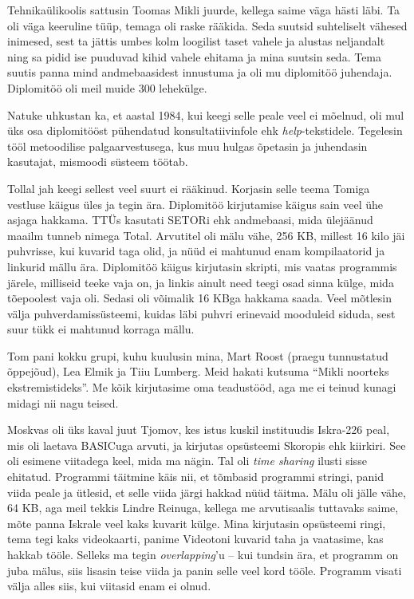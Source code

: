  
Tehnikaülikoolis sattusin 
Toomas Mikli juurde, kellega saime väga hästi 
läbi. Ta oli väga keeruline tüüp, temaga oli raske rääkida. 
Seda suutsid suhteliselt vähesed inimesed, sest ta jättis umbes kolm loogilist 
taset vahele ja alustas neljandalt ning sa pidid ise puuduvad kihid vahele 
ehitama ja mina suutsin seda. 
Tema suutis panna mind andmebaasidest innustuma ja oli 
mu diplomitöö juhendaja. Diplomitöö oli meil muide 300 lehekülge. 

Natuke uhkustan ka, et aastal 1984, kui keegi selle peale veel ei mõelnud, oli mul üks osa
diplomitööst pühendatud konsultatiivinfole ehk \emph{help}-tekstidele. 
Tegelesin tööl metoodilise palgaarvestusega, kus muu 
hulgas õpetasin ja juhendasin kasutajat, mismoodi süsteem töötab. 


Tollal jah keegi sellest veel suurt ei rääkinud. Korjasin selle teema
Tomiga vestluse käigus üles ja tegin ära. 
Diplomitöö kirjutamise käigus sain veel ühe asjaga hakkama. TTÜs kasutati 
SETORi ehk andmebaasi, mida ülejäänud 
maailm tunneb nimega Total. Arvutitel 
oli mälu vähe, 256 KB, millest 16 kilo jäi puhvrisse, kui kuvarid taga 
olid, ja nüüd ei mahtunud enam kompilaatorid ja linkurid mällu ära. Diplomitöö 
käigus kirjutasin skripti, mis vaatas programmis järele, milliseid teeke 
vaja on, ja linkis ainult need teegi osad sinna külge, mida tõepoolest vaja 
oli. Sedasi oli võimalik 16 KBga hakkama saada. Veel mõtlesin välja puhverdamissüsteemi, kuidas läbi puhvri erinevaid mooduleid siduda, sest 
suur tükk ei mahtunud korraga mällu. 

Tom pani kokku grupi, kuhu kuulusin mina, Mart Roost 
(praegu tunnustatud õppejõud), Lea 
Elmik ja Tiiu Lumberg. Meid hakati kutsuma \enquote{Mikli noorteks 
ekstremistideks}. Me kõik kirjutasime oma teadustööd, aga me ei teinud 
kunagi midagi nii nagu teised. 

Moskvas oli üks kaval juut Tjomov, kes istus kuskil instituudis 
Iskra-226 peal, mis oli laetava BASICuga arvuti, ja
kirjutas opsüsteemi Skoropis ehk kiirkiri. See oli esimene viitadega keel, 
mida ma nägin. Tal oli \emph{time sharing} ilusti sisse ehitatud. Programmi täitmine 
käis nii, et tõmbasid programmi stringi, panid viida peale ja ütlesid, et 
selle viida järgi hakkad nüüd täitma. Mälu oli jälle vähe, 64 KB, aga meil 
tekkis Lindre Reinuga, kellega me 
arvutisaalis tuttavaks saime, mõte panna Iskrale veel kaks kuvarit külge. Mina 
kirjutasin opsüsteemi ringi, tema tegi kaks videokaarti, panime Videotoni kuvarid 
taha ja vaatasime, kas hakkab tööle. Selleks ma tegin 
\emph{overlapping}'u -- kui tundsin ära, et programm on 
juba mälus, siis lisasin teise viida ja panin selle veel kord tööle. Programm visati 
välja alles siis, kui viitasid enam ei olnud. 

